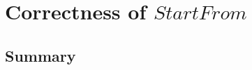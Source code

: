 \chapter[$StartFrom$]{Correctness of $StartFrom$}\label{ch16}

\newpage
\section{Summary}\label{ch16.summary}

\ldefsummary %
\lthmsummary %
\lthmaddeddefsummary %
\lthmaddedthmsummary %
\lzevessummary %

